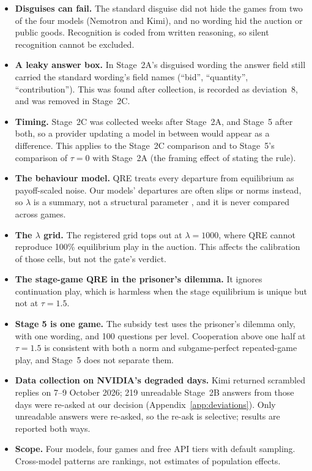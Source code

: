 \documentclass[10pt]{article}
\theoremstyle{definition}
\theoremstyle{remark}
\newcommand{\lam}{\lambda}
\begin{document}
\begin{itemize}
\item \textbf{Disguises can fail.} The standard disguise did not hide the games from two of the four
  models (Nemotron and Kimi), and no wording hid the auction or public goods. Recognition is coded from written
  reasoning, so silent recognition cannot be excluded.
\item \textbf{A leaky answer box.} In Stage~2A's disguised wording the answer field still carried
  the standard wording's field names (``bid'', ``quantity'', ``contribution''). This was found after
  collection, is recorded as deviation~8, and was removed in Stage~2C.
\item \textbf{Timing.} Stage~2C was collected weeks after Stage~2A, and Stage~5 after both, so a
  provider updating a model in between would appear as a difference. This applies to the
  Stage~2C comparison and to Stage~5's comparison of $\tau=0$ with Stage~2A (the framing
  effect of stating the rule).
\item \textbf{The behaviour model.} QRE treats every departure from equilibrium as payoff-scaled
  noise. Our models' departures are often slips or norms instead, so $\lam$ is a summary, not a
  structural parameter \citep{pechon2026auditing}, and it is never compared across games.
\item \textbf{The $\lam$ grid.} The registered grid tops out at $\lam = 1000$, where QRE cannot
  reproduce 100\% equilibrium play in the auction. This affects the calibration of those cells,
  but not the gate's verdict.
\item \textbf{The stage-game QRE in the prisoner's dilemma.} It ignores continuation play, which
  is harmless when the stage equilibrium is unique but not at $\tau=1.5$.
\item \textbf{Stage 5 is one game.} The subsidy test uses the prisoner's dilemma only, with one
  wording, and 100 questions per level. Cooperation above one half at $\tau=1.5$ is consistent
  with both a norm and subgame-perfect repeated-game play, and Stage~5 does not separate them.
\item \textbf{Data collection on NVIDIA's degraded days.} Kimi returned scrambled replies on 7--9
  October 2026; 219 unreadable Stage~2B answers from those days were re-asked at our
  decision (Appendix~\ref{app:deviations}). Only unreadable answers were re-asked, so the re-ask
  is selective; results are reported both ways.
\item \textbf{Scope.} Four models, four games and free API tiers with default sampling.
  Cross-model patterns are rankings, not estimates of population effects.
\end{itemize}
\end{document}
